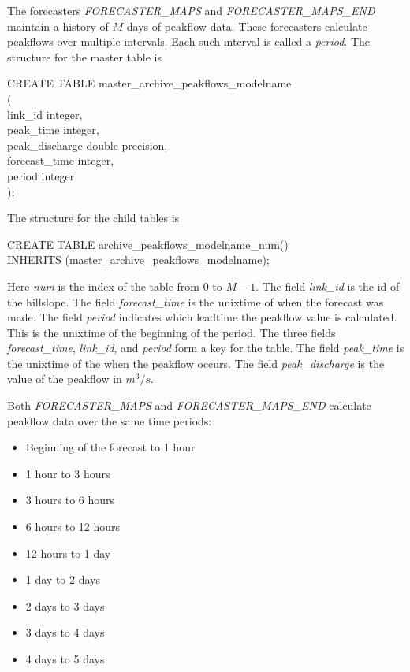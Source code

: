 \documentclass[12pt]{article}
\newenvironment{codeindent}
{\begin{list}{}
        {\setlength{\leftmargin}{.1in}}
        \item[]
}
{\end{list}}
\begin{document}
The forecasters \emph{FORECASTER\_MAPS} and \emph{FORECASTER\_MAPS\_END} maintain a history of $M$ days of peakflow data. These forecasters calculate peakflows over multiple intervals. Each such interval is called a \emph{period}. The structure for the master table is
\begin{codeindent}
CREATE TABLE master\_archive\_peakflows\_modelname \\
( \\
  link\_id integer, \\
  peak\_time integer, \\
  peak\_discharge double precision, \\
  forecast\_time integer, \\
  period integer \\
);
\end{codeindent}
The structure for the child tables is
\begin{codeindent}
CREATE TABLE archive\_peakflows\_modelname\_num() \\
INHERITS (master\_archive\_peakflows\_modelname);
\end{codeindent}
Here \emph{num} is the index of the table from $0$ to $M-1$. The field \emph{link\_id} is the id of the hillslope. The field \emph{forecast\_time} is the unixtime of when the forecast was made. The field \emph{period} indicates which leadtime the peakflow value is calculated. This is the unixtime of the beginning of the period. The three fields \emph{forecast\_time}, \emph{link\_id}, and \emph{period} form a key for the table. The field \emph{peak\_time} is the unixtime of the when the peakflow occurs. The field \emph{peak\_discharge} is the value of the peakflow in $m^3/s$.

Both \emph{FORECASTER\_MAPS} and \emph{FORECASTER\_MAPS\_END} calculate peakflow data over the same time periods:
\begin{itemize}
 \item Beginning of the forecast to 1 hour
 \item 1 hour to 3 hours
 \item 3 hours to 6 hours
 \item 6 hours to 12 hours
 \item 12 hours to 1 day
 \item 1 day to 2 days
 \item 2 days to 3 days
 \item 3 days to 4 days
 \item 4 days to 5 days
\end{itemize}
\end{document}
